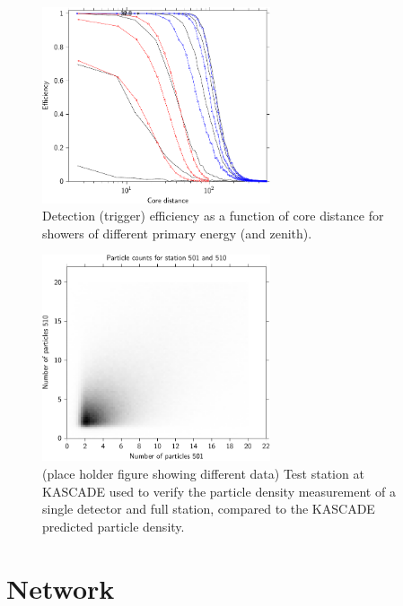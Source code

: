 \begin{figure}
    \centering
    \includegraphics[width=0.6\textwidth]
                    {plots/experiment/efficiency_two_16}
    \caption{Detection (trigger) efficiency as a function of core distance for showers of different primary energy (and zenith).}
    \label{fig:efficiency_two_16}
\end{figure}


\begin{figure}
    \centering
    \includegraphics[width=0.6\textwidth]
                    {plots/experiment/n_501_510_sum}
    \caption{(place holder figure showing different data) Test station at KASCADE used to verify the particle density measurement of a single detector and full station, compared to the KASCADE predicted particle density.}
    \label{fig:n_501_510_sum}
\end{figure}


\section{Network}

